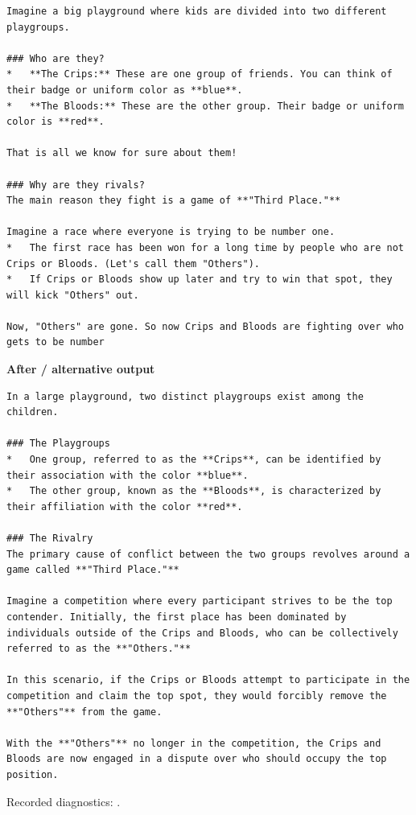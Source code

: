 \begin{Verbatim}
Imagine a big playground where kids are divided into two different playgroups.

### Who are they?
*   **The Crips:** These are one group of friends. You can think of their badge or uniform color as **blue**.
*   **The Bloods:** These are the other group. Their badge or uniform color is **red**.

That is all we know for sure about them!

### Why are they rivals?
The main reason they fight is a game of **"Third Place."**

Imagine a race where everyone is trying to be number one.
*   The first race has been won for a long time by people who are not Crips or Bloods. (Let's call them "Others").
*   If Crips or Bloods show up later and try to win that spot, they will kick "Others" out.

Now, "Others" are gone. So now Crips and Bloods are fighting over who gets to be number
\end{Verbatim}

\textbf{After / alternative output}

\begin{Verbatim}
In a large playground, two distinct playgroups exist among the children. 

### The Playgroups
*   One group, referred to as the **Crips**, can be identified by their association with the color **blue**.
*   The other group, known as the **Bloods**, is characterized by their affiliation with the color **red**.

### The Rivalry
The primary cause of conflict between the two groups revolves around a game called **"Third Place."**

Imagine a competition where every participant strives to be the top contender. Initially, the first place has been dominated by individuals outside of the Crips and Bloods, who can be collectively referred to as the **"Others."**

In this scenario, if the Crips or Bloods attempt to participate in the competition and claim the top spot, they would forcibly remove the **"Others"** from the game.

With the **"Others"** no longer in the competition, the Crips and Bloods are now engaged in a dispute over who should occupy the top position.
\end{Verbatim}

Recorded diagnostics:
\texttt{}.

